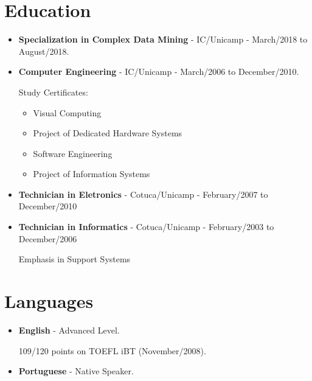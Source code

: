 \documentclass[a4paper,10pt]{article}
\begin{document}
  \section{Education}
    \begin{itemize}

      \item
        \textbf{Specialization in Complex Data Mining} - IC/Unicamp - March/2018 to August/2018.

      \item  
        \textbf{Computer Engineering} - IC/Unicamp - March/2006 to December/2010.


        Study Certificates:
        \begin{itemize}
          \item Visual Computing
          \item Project of Dedicated Hardware Systems
          \item Software Engineering
          \item Project of Information Systems
        \end{itemize}


      \item  
        \textbf{Technician in Eletronics} - Cotuca/Unicamp - February/2007 to December/2010


      \item  
        \textbf{Technician in Informatics} - Cotuca/Unicamp - February/2003 to December/2006

        Emphasis in Support Systems


    \end{itemize}



  \section{Languages}
    \begin{itemize}
      \item  
        \textbf{English} - Advanced Level.

        109/120 points on TOEFL iBT (November/2008).

      \item  
        \textbf{Portuguese} - Native Speaker.
    \end{itemize}
\end{document}
